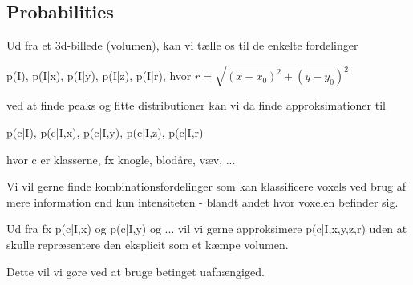 \subsection*{Probabilities}


Ud fra et 3d-billede (volumen), kan vi tælle os til de enkelte fordelinger

p(I), p(I|x), p(I|y), p(I|z), p(I|r), hvor $r=\sqrt{(x-x_0)^2+(y-y_0)^2}$

ved at finde peaks og fitte distributioner kan vi da finde approksimationer til

p(c|I), p(c|I,x), p(c|I,y), p(c|I,z), p(c|I,r)

hvor c er klasserne, fx knogle, blodåre, væv, ... 

Vi vil gerne finde kombinationsfordelinger som kan klassificere voxels ved brug af mere information end kun intensiteten - blandt andet hvor voxelen befinder sig.

Ud fra fx p(c|I,x) og p(c|I,y) og ... vil vi gerne approksimere p(c|I,x,y,z,r) uden at skulle repræsentere den eksplicit som et kæmpe volumen.

Dette vil vi gøre ved at bruge betinget uafhængiged. 
